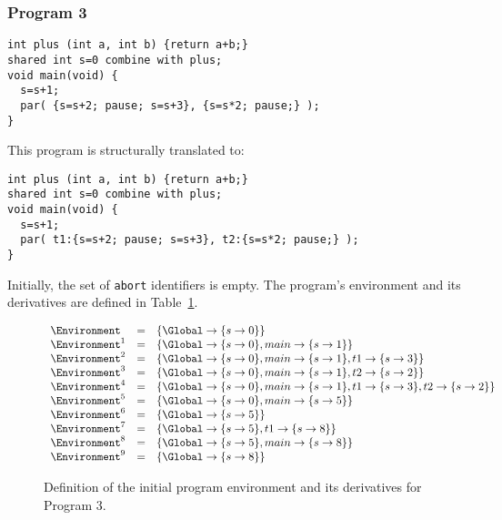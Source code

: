\subsubsection{Program 3}
\begin{lstlisting}[style=snippet]
int plus (int a, int b) {return a+b;}
shared int s=0 combine with plus;
void main(void) {
  s=s+1;
  par( {s=s+2; pause; s=s+3}, {s=s*2; pause;} );
}
\end{lstlisting}
This program is structurally translated to:
\begin{lstlisting}[style=snippet]
int plus (int a, int b) {return a+b;}
shared int s=0 combine with plus;
void main(void) {
  s=s+1;
  par( t1:{s=s+2; pause; s=s+3}, t2:{s=s*2; pause;} );
}
\end{lstlisting}
Initially, the set of \verb$abort$ identifiers \Abort{}
is empty. The program's environment \Environment{} and its
derivatives are defined in Table~\ref{figure:forec_program_3}.
\newline

\begin{figure}
	\centering
	$$\begin{array}{l l l l l l l}
		 \Environment	&=& \lbrace \Global \to \lbrace s \to 0 \rbrace \rbrace																		\\
		 \Environment^1	&=& \lbrace \Global \to \lbrace s \to 0 \rbrace, main \to \lbrace s \to 1 \rbrace \rbrace									\\
		 \Environment^2	&=& \lbrace \Global \to \lbrace s \to 0 \rbrace, main \to \lbrace s \to 1 \rbrace, t1 \to \lbrace s \to 3 \rbrace \rbrace	\\
		 \Environment^3	&=& \lbrace \Global \to \lbrace s \to 0 \rbrace, main \to \lbrace s \to 1 \rbrace, t2 \to \lbrace s \to 2 \rbrace \rbrace	\\
		 \Environment^4	&=& \lbrace \Global \to \lbrace s \to 0 \rbrace, main \to \lbrace s \to 1 \rbrace, t1 \to \lbrace s \to 3 \rbrace, t2 \to \lbrace s \to 2 \rbrace \rbrace	\\
		 \Environment^5	&=& \lbrace \Global \to \lbrace s \to 0 \rbrace, main \to \lbrace s \to 5 \rbrace \rbrace									\\
		 \Environment^6	&=& \lbrace \Global \to \lbrace s \to 5 \rbrace \rbrace																		\\
		 \Environment^7	&=& \lbrace \Global \to \lbrace s \to 5 \rbrace, t1 \to \lbrace s \to 8 \rbrace \rbrace										\\
		 \Environment^8	&=& \lbrace \Global \to \lbrace s \to 5 \rbrace, main \to \lbrace s \to 8 \rbrace \rbrace									\\
		 \Environment^9	&=& \lbrace \Global \to \lbrace s \to 8 \rbrace \rbrace																		\\
	\end{array}$$
	
	\caption{Definition of the initial program environment and its derivatives for Program 3.}
	\label{figure:forec_program_3}
\end{figure}

